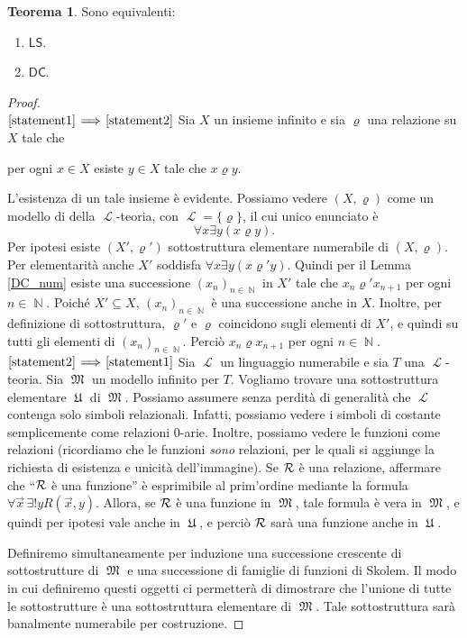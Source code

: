 \documentclass[12pt,a4paper]{report}
\theoremstyle{definition}
\newtheorem{teo}{Teorema}[section]  %
\theoremstyle{num.custom-title}
\DeclareMathOperator{\LL}{\mathcal{L}}
\DeclareMathOperator{\N}{\mathbb{N}}
\DeclareMathOperator{\M}{\mathfrak{M}}
\DeclareMathOperator{\U}{\mathfrak{U}}
\DeclareMathOperator{\sse}{\subseteq}
\newcommand{\DC}{\ensuremath{\mathsf{DC}}\xspace}
\newcommand{\LS}{\ensuremath{\mathsf{LS}}\xspace}
\newcommand{\Implies}[2]{$\text{\ref{statement#1}}\!\implies\!\text{\ref{statement#2}}$}%
\newcommand{\punto}[1]{\item \label{statement#1}}
\newenvironment{equivalence}
    {\begin{enumerate}[label=(\arabic*),ref=(\arabic*)]
    }
    { 
	\end{enumerate}
    }
\begin{document}
\begin{teo} Sono equivalenti:
\begin{equivalence}
\punto{1} \LS.
\punto{2} \DC.
\end{equivalence}
\begin{proof}\ \\
\Implies{1}{2} Sia $X$ un insieme infinito e sia $\varrho$ una relazione su $X$ tale che 
\begin{center}
per ogni $x \in X$ esiste $y \in X$ tale che $x \varrho y$.
\end{center}
L'esistenza di un tale insieme è evidente. Possiamo vedere $(X,\varrho)$ come un modello di della $\LL$-teoria, con $\LL=\{\varrho\}$, il cui unico enunciato è 
\[
\forall x \exists y (x \varrho y).
\]
Per ipotesi esiste $(X',\varrho')$ sottostruttura elementare numerabile di $(X,\varrho)$. Per elementarità anche $X'$ soddisfa $\forall x \exists y (x \varrho' y)$. Quindi per il Lemma \ref{DC_num} esiste una successione $(x_n)_{n \in \N}$ in $X'$ tale che $x_n \varrho' x_{n+1}$ per ogni $n \in \N$. Poiché $X' \sse X$, $(x_n)_{n \in \N}$ è una successione anche in $X$. Inoltre, per definizione di sottostruttura, $\varrho'$ e $\varrho$ coincidono sugli elementi di $X'$, e quindi su tutti gli elementi di $(x_n)_{n \in \N}$. Perciò $x_n \varrho x_{n+1}$ per ogni $n \in \N$.\\
\Implies{2}{1} Sia $\LL$ un linguaggio numerabile e sia $T$ una $\LL$-teoria. Sia $\M$ un modello infinito per $T$. Vogliamo trovare una sottostruttura elementare $\U$ di $\M$. Possiamo assumere senza perdità di generalità che $\LL$ contenga solo simboli relazionali. Infatti, possiamo vedere i simboli di costante semplicemente come relazioni $0$-arie. Inoltre, possiamo vedere le funzioni come relazioni (ricordiamo che le funzioni \emph{sono} relazioni, per le quali si aggiunge la richiesta di esistenza e unicità dell'immagine). Se $\cal R$ è una relazione, affermare che ``$\cal R$ è una funzione'' è esprimibile al prim'ordine mediante la formula $\forall \vec x \, \exists ! y R(\vec x, y)$. Allora, se $\cal R$ è una funzione in $\M$, tale formula è vera in $\M$, e quindi per ipotesi vale anche in $\U$, e perciò $\cal R$ sarà una funzione anche in $\U$.

Definiremo simultaneamente per induzione una successione crescente di sottostrutture di $\M$ e una successione di famiglie di funzioni di Skolem. Il modo in cui definiremo questi oggetti ci permetterà di dimostrare che l'unione di tutte le sottostrutture è una sottostruttura elementare di $\M$. Tale sottostruttura sarà banalmente numerabile per costruzione.


\end{proof}
\end{teo}
\end{document}
